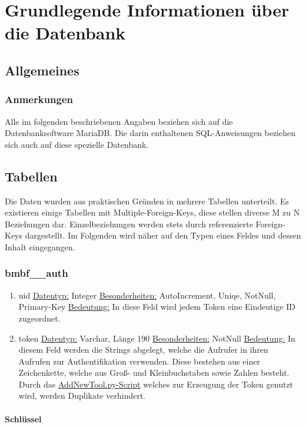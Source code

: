 \documentclass[12pt,parskip=full, pagea4]{scrreprt}
\begin{document}
		\chapter[Datenbank]{Grundlegende Informationen \"uber die Datenbank}
			\section{Allgemeines}
			\subsection{Anmerkungen}Alle im folgenden beschriebenen Angaben beziehen sich auf die Datenbanksoftware MariaDB. Die darin enthaltenen SQL-Anweisungen beziehen sich auch auf diese spezielle Datenbank.
			\section{Tabellen}Die Daten wurden aus praktischen Gr\"unden in mehrere Tabellen unterteilt. Es existieren einige Tabellen mit Multiple-Foreign-Keys, diese stellen diverse M zu N Beziehungen dar. Einzelbeziehungen werden stets durch referenzierte Foreign-Keys dargestellt. Im Folgenden wird näher auf den Typen eines Feldes und dessen Inhalt eingegangen.
			\subsection{bmbf\_\_auth}
			\begin{enumerate}
				\item uid
				\subitem \underline{Datentyp:} Integer
				\subitem \underline{Besonderheiten:} AutoIncrement, Uniqe, NotNull, Primary-Key
				\subitem \underline{Bedeutung:} In diese Feld wird jedem Token eine Eindeutige ID zugeordnet.
				\item token
				\subitem \underline{Datentyp:} Varchar, L\"ange 190
				\subitem \underline{Besonderheiten:} NotNull
				\subitem \underline{Bedeutung:} In diesem Feld werden die Strings abgelegt, welche die Aufrufer in ihren Aufrufen zur Authentifikation verwenden. Diese bestehen aus einer Zeichenkette, welche aus Groß- und Kleinbuchstaben sowie Zahlen besteht. Durch das \hyperlink{ANT}{AddNewTool.py-Script} welches zur Erzeugung der Token genutzt wird, werden Duplikate verhindert.
			\end{enumerate}
			\leftskip=0cm
				\subsubsection{Schl\"ussel}
\end{document}
